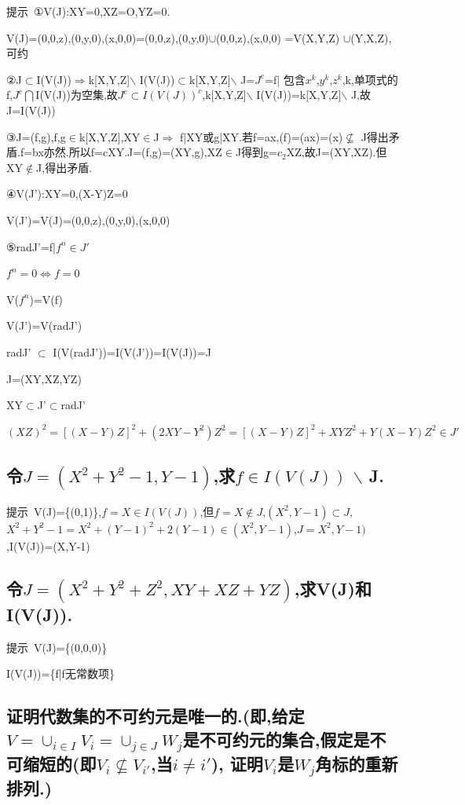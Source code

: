 \documentclass[UTF8]{book}
\begin{document}
	
	$\textbf{提示}$\ ①V(J):XY=0,XZ=O,YZ=0.
	
	
	V(J)={(0,0,z),(0,y,0),(x,0,0)}={(0,0,z),(0,y,0)}$\cup${(0,0,z),(x,0,0)} =V(X,Y,Z) $\cup$(Y,X,Z),可约
	
	
	②J$\subset$I(V(J))$\Rightarrow$k[X,Y,Z]$\backslash$ I(V(J))$\subset$k[X,Y,Z]$\backslash$ J=$J^{c}$={f| 包含$x^{k}$,$y^{k}$,$z^{k}$,k,单项式的f},$J^{c}\bigcap$I(V(J))为空集,故$J^{c}\subset I(V(J))^{c}$,k[X,Y,Z]$\backslash$ I(V(J))=k[X,Y,Z]$\backslash$ J,故J=I(V(J))
	
	
	③J=(f,g),f,g$\in$k[X,Y,Z],XY$\in$J$\Rightarrow$ f|XY或g|XY.若f=ax,(f)=(ax)=(x)$\nsubseteq$ J得出矛盾.f=bx亦然.所以f=cXY.J=(f,g)=(XY,g),XZ$\in$J得到g=$c_{2}$XZ,故J=(XY,XZ).但XY$\notin$J,得出矛盾.
	
	
	
	④V(J'):XY=0,(X-Y)Z=0
	
	
	V(J')=V(J)={(0,0,z),(0,y,0),(x,0,0)}
	
	
	⑤radJ'={f|$f^{n}\in J'$}
	
	
	$f^{n}=0 \Leftrightarrow f=0$
	
	
	V($f^{n}$)=V(f)
	
	
	V(J')=V(radJ')
	
	
	radJ' $\subset$ I(V(radJ'))=I(V(J'))=I(V(J))=J
	
	
	J=(XY,XZ,YZ)
	
	
	XY$\subset$J'$\subset$radJ'
	
	
	$(XZ)^{2}=[(X-Y)Z]^{2}+(2XY-Y^{2})Z^{2}=[(X-Y)Z]^{2}+XYZ^{2} +Y(X-Y)Z^{2} \in J'$
	
	
	\subsection{ 令$J=(X^{2}+Y^{2}-1,Y-1)$,求$f\in I(V(J))$ $\backslash$ J.}
	
	
	$\textbf{提示}$\ V(J)=\{(0,1)\},$f=X\in I(V(J))$,但$f=X\notin J$,$(X^{2},Y-1)\subset J$,$X^{2}+Y^{2}-1=X^{2}+(Y-1)^{2}+2(Y-1)\in(X^{2},Y-1)$,$J=X^{2},Y-1)$,I(V(J))=(X,Y-1)
	
	
	\subsection{ 令$J=(X^{2}+Y^{2}+Z^{2},XY+XZ+YZ)$,求V(J)和I(V(J)).}
	
	
	$\textbf{提示}$\ V(J)=\{(0,0,0)\}
	
	
	I(V(J))=\{f|f无常数项\}
	
	
	\subsection{ 证明代数集的不可约元是唯一的.(即,给定$V=\cup _{i\in I}V_{i}=\cup_{j\in J}W_{j}$是不可约元的集合,假定是不可缩短的(即$V_{i}\nsubseteq V_{i'}$,当$i\ne i'$), 证明$V_{i}$是$W_{j}$角标的重新排列.)}
	
\end{document}
